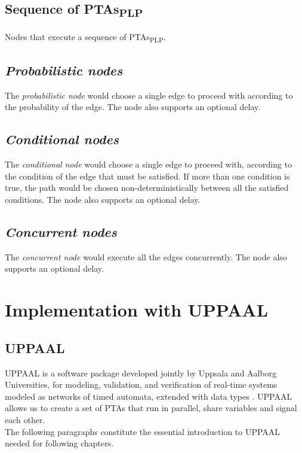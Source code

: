 \section{Sequence of PTAs\textsubscript{PLP}}
Nodes that execute a sequence of PTAs\textsubscript{PLP}.   \clearpage
\section{\textit{Probabilistic nodes}}
The \textit{probabilistic node} would choose a single edge to proceed with according to the probability of the edge. The node also supports an optional delay.  \clearpage
\section{\textit{Conditional nodes}}
The \textit{conditional node} would choose a single edge to proceed with, according to the condition of the edge that must be satisfied. If more than one condition is true, the path would be chosen non-deterministically between all the satisfied conditions. The node also supports an optional delay.   \clearpage
\section{\textit{Concurrent nodes}}
The \textit{concurrent node} would execute all the edges concurrently. The node also supports an optional delay.  \clearpage
\chapter{Implementation with UPPAAL}
\section{UPPAAL }
UPPAAL is a software package developed jointly by Uppsala and Aalborg Universities, for modeling, validation, and verification of real-time systems modeled as networks of timed automata, extended with data types \cite{uppaalIntroduction}. UPPAAL allows us to create a set of PTAs that run in parallel, share variables and signal each other. \\
The following paragraphs constitute the essential introduction to UPPAAL needed for following chapters.\\
